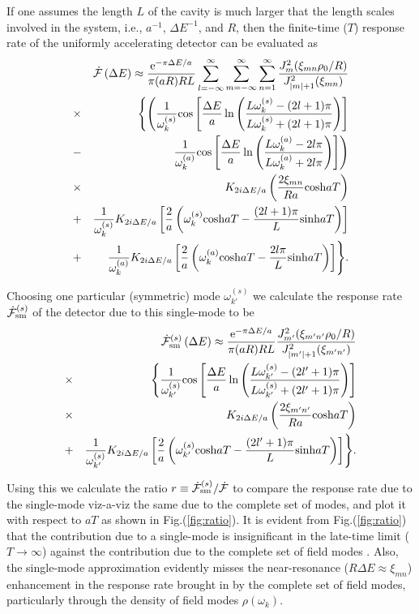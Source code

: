\documentclass[aps,prl,nofootinbib,preprintnumbers,floatfix,twocolumn,superscriptaddress]{revtex4}
\def\nn{\nonumber}
\def\nn{\nonumber}
\def\l{\left}
\def\r{\right}
\def\f{\frac}
\def\e{{\rm e}}
\begin{document}
If one assumes the length $L$ of the cavity is much 
larger that the length scales involved in the system, i.e., $a^{-1}$, $\Delta E^{-1}$, 
and $R$, then the finite-time ($T$) response rate of the uniformly accelerating detector can be evaluated as 
\begin{eqnarray}
  &&\dot {\cal F}\l(\Delta E\r)\approx\f{\e^{-\pi\Delta E/a}}{\pi (aR) RL} 
 \sum_{l=-\infty}^{\infty} \sum_{m=-\infty}^{\infty}\sum_{n=1}^{\infty} 
 \f{J^2_{m}(\xi_{mn} \rho_0/R)}{J^2_{|m|+1}(\xi_{mn})} \nn \\ 
 &\times& \Biggl\{\Biggl(\f{1}{\omega^{(s)}_{k}} 
 {\rm cos}\left[\f{\Delta E}{a} 
 \ln\l(\f{L\omega^{(s)}_{k}-(2l+1)\pi}{L\omega^{(s)}_{k}+(2l+1)\pi}\r)\right] \nn \\ 
 &-&\f{1}{\omega^{(a)}_{k}} 
 {\rm cos}\left[\f{\Delta E}{a} \ln\l(\f{L\omega^{(a)}_{k}-2l\pi}{L\omega^{(a)}_{k}+2l\pi}\r)\right] 
  \Biggr) \nn \\ 
 &\times& K_{2i\Delta E/a}\l(\f{2\xi_{mn}}{Ra}{\rm cosh}aT\r) \nn \\ 
 &+&\f{1}{\omega^{(s)}_{k}} 
 K_{2i\Delta E/a}\left[\f{2}{a}\l(\omega^{(s)}_{k}{\rm cosh}aT-\f{(2l+1)\pi}{L}{\rm sinh}aT\r)\right] \nn \\ 
 &+&\f{1}{\omega^{(a)}_{k}} 
 K_{2i\Delta E/a} 
 \left[\f{2}{a}\l(\omega^{(a)}_{k}{\rm cosh}aT-\f{2l\pi}{L}{\rm sinh}aT\r)\right]\Biggr\}. 
\end{eqnarray}

Choosing one particular (symmetric) mode $\omega^{(s)}_{k'}$ we calculate the response rate 
${\dot {\cal F}}^{(s)}_{\rm sm}$ 
of the detector due to this single-mode to be 
\begin{eqnarray}
  &&{\dot {\cal F}}^{(s)}_{\rm sm}\l(\Delta E\r)\approx\f{\e^{-\pi\Delta E/a}}{\pi (aR) RL} 
 \f{J^2_{m'}(\xi_{m'n'} \rho_0/R)}{J^2_{|m'|+1}(\xi_{m'n'})} \\ 
 &\times& \Biggl\{\f{1}{\omega^{(s)}_{k'}} 
 {\rm cos}\left[\f{\Delta E}{a} 
 \ln\l(\f{L\omega^{(s)}_{k'}-(2l'+1)\pi}{L\omega^{(s)}_{k'}+(2l'+1)\pi}\r)\right] \nn \\ 
 &\times& K_{2i\Delta E/a}\l(\f{2\xi_{m'n'}}{Ra}{\rm cosh}aT\r) \nn \\ 
 &+&\f{1}{\omega^{(s)}_{k'}} 
 K_{2i\Delta E/a}
 \left[\f{2}{a}\l(\omega^{(s)}_{k'}{\rm cosh}aT-\f{(2l'+1)\pi}{L}{\rm sinh}aT\r)\right]\Biggr\}. \nn 
\end{eqnarray}

Using this 
we calculate the ratio $r\equiv{\dot {\cal F}}^{(s)}_{\rm sm}/{\dot {\cal F}}$ to 
compare the response rate due to the single-mode viz-a-viz the same 
due to the complete set of modes, and plot it with respect to $aT$ as 
shown in Fig.(\ref{fig:ratio}). It is evident from Fig.(\ref{fig:ratio}) that 
the contribution due to a single-mode is insignificant in the late-time limit 
($T\to\infty$) against the contribution due to the complete set of field modes \cite{Lopp-2018}. 
Also, the single-mode approximation evidently misses the 
near-resonance ($R\Delta E \approx \xi_{mn}$) 
enhancement in the response rate brought in by the complete set of field modes, 
particularly through the density of field modes $\rho(\omega_{k})$. 
\end{document}
